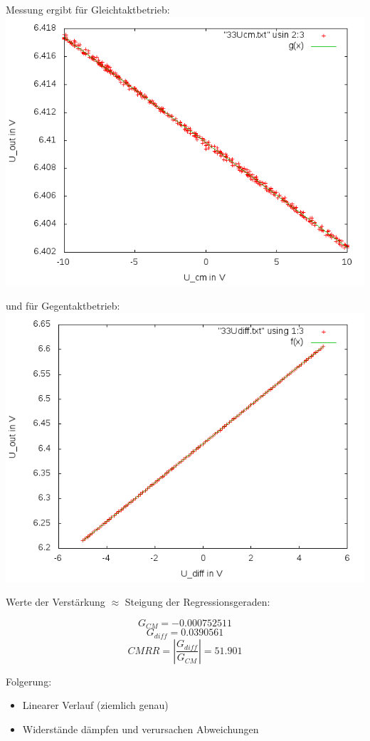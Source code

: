 \documentclass[compress,11pt]{beamer}
\begin{document}
\begin{frame}
Messung ergibt für Gleichtaktbetrieb:
\includegraphics[width=.7\textwidth]{../daten/messungen/3aufgabe/1cm}\\
\end{frame}
\begin{frame}
und für Gegentaktbetrieb:
\includegraphics[width=.7\textwidth]{../daten/messungen/3aufgabe/1diff}\\
\end{frame}
\begin{frame}
Werte der Verstärkung $\approx$ Steigung der Regressionsgeraden:

\begin{equation}
G_{CM} = -0.000752511
\end{equation}
\begin{equation}
G_{diff} = 0.0390561
\end{equation}
\begin{equation}
CMRR = |\frac{G_{diff}}{G_{CM}}| = 51.901
\end{equation}

\end{frame}
\begin{frame}
Folgerung:\\
\begin{itemize}
\item Linearer Verlauf (ziemlich genau)
\item Widerstände dämpfen und verursachen Abweichungen
\end{itemize}
\end{frame}
\end{document}
